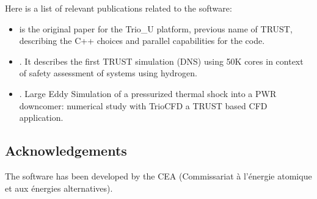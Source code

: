 Here is a list of relevant publications related to the software:

\begin{itemize}
   \item {} is the original paper for the Trio_U platform, previous name of TRUST, describing the C++ choices and parallel capabilities for the code.
   \item {}. It describes the first TRUST simulation (DNS) using 50K cores in context of safety assessment of systems using hydrogen.
   \item {}. Large Eddy Simulation of a pressurized thermal shock into a PWR downcomer: numerical study with TrioCFD a TRUST based CFD application.
\end{itemize}

\subsection{Acknowledgements}
\label{sec::TRUST Platform:acknowledgements}

The software has been developed by the CEA (Commissariat à l'énergie atomique et aux énergies alternatives). 

